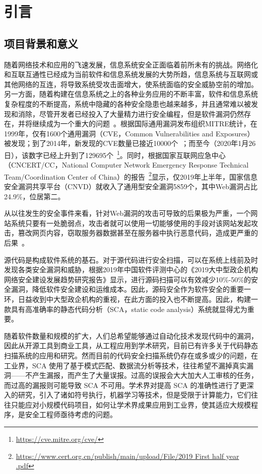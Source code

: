 \chapter{引言}

\section{项目背景和意义}
随着网络技术和应用的飞速发展，信息系统安全正面临着前所未有的挑战。网络化和互联互通性已经成为当前软件和信息系统发展的大势所趋，信息系统与互联网或其他网络的互连，将导致系统受攻击面增大，使系统面临的安全威胁空前的增加。另一方面，随着构建在信息系统之上的各种业务应用的不断丰富，软件和信息系统复杂程度的不断提高，系统中隐藏的各种安全隐患也越来越多，并且通常难以被发现和消除，尽管开发者已经投入了大量精力进行安全编程，但是软件漏洞仍然存在，并将继续成为一个重大的问题~\cite{vuldeepecker}。根据国际通用漏洞发布组织MITRE统计，在1999年，仅有1600个通用漏洞（CVE，Common Vulnerabilities and Exposures）被发现；到了2014年，新发现的CVE数量已接近10000个~\cite{liujian2018}；而至今（2020年1月26日），该数字已经上升到了129695个~\footnote{\url{https://cve.mitre.org/cve/}}。同时，根据国家互联网应急中心（CNCERT/CC，National Computer Network Emergency Response Technical Team/Coordination Center of China）的报告~\footnote{\url{https://www.cert.org.cn/publish/main/upload/File/2019 First half year .pdf}}显示，仅2019年上半年，国家信息安全漏洞共享平台（CNVD）就收入了通用型安全漏洞5859个，其中Web漏洞占比24.9\%，位居第二。

从以往发生的安全事件来看，针对Web漏洞的攻击可导致的后果极为严重，一个网站系统只要有一处脆弱点，攻击者就可以使用一切能够使用的手段对该网站发起攻击，篡改网页内容，窃取服务器数据甚至在服务器中执行恶意代码，造成更严重的后果~\cite{WebApplication}。

源代码是构成软件系统的基石。对于源代码进行安全扫描，可以在系统上线前及时发现各类安全漏洞和威胁，根据2019年中国软件评测中心的《2019大中型政企机构网络安全建设发展趋势研究报告》显示，进行源码扫描可以有效减少10\%-50\%的安全漏洞，降低软件安全建设和运维成本。因此，源码安全作为软件安全的重要一环，日益收到中大型政企机构的重视，在此方面的投入也不断提高。因此，构建一款具有高准确率的静态代码分析（SCA，static code analysis）系统就显得尤为重要。

随着软件数量和规模的扩大，人们总希望能够通过自动化技术发现代码中的漏洞，因此从开源工具到商业工具，从工程应用到学术研究，目前已有许多关于代码静态扫描系统的应用和研究。然而目前的代码安全扫描系统仍存在或多或少的问题，在工业界，SCA 使用了基于模式匹配、数据流分析等技术，往往希望不漏掉真实漏洞——不产生漏报，而产生了大量误报。过高的误报会大大加大人工审核的任务，而过高的漏报则可能导致 SCA 不可用。学术界对提高 SCA 的准确性进行了更深入的研究，引入了诸如符号执行，机器学习等技术，但是受限于计算能力，它们往往只能应对小规模代码项目，如何让学术界成果应用到工业界，使其适应大规模程序，是安全工程师亟待考虑的问题。

